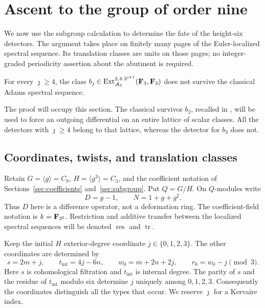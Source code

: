 \section{Ascent to the group of order nine}\label{sec:ascent}

We now use the subgroup calculation to determine the fate of the
height-six detectors.  The argument takes place on finitely many pages
of the Euler-localized spectral sequence.  Its translation classes are
units on those pages; no integer-graded periodicity assertion about the
abutment is required.

\begin{theorem}\label{g:tail-exclusion}
For every $\jmath\geq4$, the class
$b_{\jmath}\in\operatorname{Ext}_{\mathcal A_3}^{2,4\cdot3^{\jmath+1}}
(\mathbf F_3,\mathbf F_3)$ does not survive the classical Adams spectral sequence.
\end{theorem}

The proof will occupy this section.  The classical survivor $b_2$,
recalled in \cite[Corollary~1.2]{Amelotte}, will be
used to force an outgoing differential on an entire lattice of scalar
classes.  All the detectors with $\jmath\geq4$ belong to that lattice,
whereas the detector for $b_3$ does not.

\subsection{Coordinates, twists, and translation classes}

Retain $G=\langle g\rangle=C_9$, $H=\langle g^3\rangle=C_3$,
and the coefficient notation of Sections~\ref{sec:coefficients}
and~\ref{sec:subgroup}.  Put $Q=G/H$.  On $Q$-modules write
\[
 D=g-1,\qquad N=1+g+g^2.
\]
Thus $D$ here is a difference operator, not a deformation ring.  The
coefficient-field notation is $k=\mathbf F_{3^6}$.  Restriction and additive
transfer between the localized spectral sequences will be denoted
$\operatorname{res}$ and $\operatorname{tr}$.

Keep the initial $H$ exterior-degree coordinate $j\in\{0,1,2,3\}$.
The other coordinates are determined by
\begin{equation}\label{g:coordinates}
 s=2m+j,\qquad t_{\mathrm{int}}=4j-6n,\qquad
 w_0=m+2n+2j,\qquad r_0=w_0-j\pmod3.
\end{equation}
Here $s$ is cohomological filtration and $t_{\mathrm{int}}$ is internal
degree.  The parity of $s$ and the residue of $t_{\mathrm{int}}$ modulo
six determine $j$ uniquely among $0,1,2,3$.  Consequently the
coordinates distinguish all the types that occur.  We reserve
$\jmath$ for a Kervaire index.

